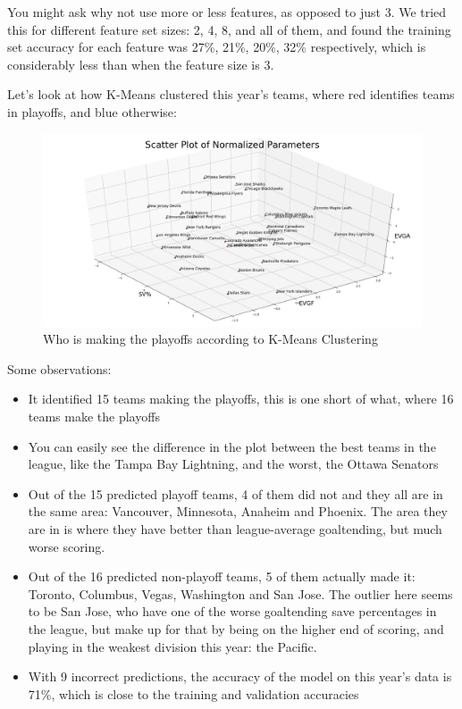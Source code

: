 \documentclass[10pt,letterpaper]{article}
\begin{document}
You might ask why not use more or less features, as opposed to just 3. We tried this for different feature set sizes: 2, 4, 8, and all of them, and found the training set accuracy for each feature was 27\%, 21\%, 20\%, 32\%  respectively, which is considerably less than when the feature size is 3.

Let's look at how K-Means clustered this year's teams, where red identifies teams in playoffs, and blue otherwise:
\begin{figure}[H]
    \centering
    \includegraphics[scale = 0.3]{kScatter.png}
    \caption{Who is making the playoffs according to K-Means Clustering}
    \label{fig:my_label}
\end{figure}

Some observations:
\begin{itemize}
    \item It identified 15 teams making the playoffs, this is one short of what, where 16 teams make the playoffs
    \item You can easily see the difference in the plot between the best teams in the league, like the Tampa Bay Lightning, and the worst, the Ottawa Senators
    \item Out of the 15 predicted playoff teams, 4 of them did not and they all are in the same area: Vancouver, Minnesota, Anaheim and Phoenix. The area they are in is where they have better than league-average goaltending, but much worse scoring.
    \item Out of the 16 predicted non-playoff teams, 5 of them actually made it: Toronto, Columbus, Vegas,  Washington and San Jose. The outlier here seems to be San Jose, who have one of the worse goaltending save percentages in the league, but make up for that by being on the higher end of scoring, and playing in the weakest division this year: the Pacific. 
    \item With 9 incorrect predictions, the accuracy of the model on this year's data is 71\%, which is close to the training and validation accuracies
\end{itemize}
\end{document}
